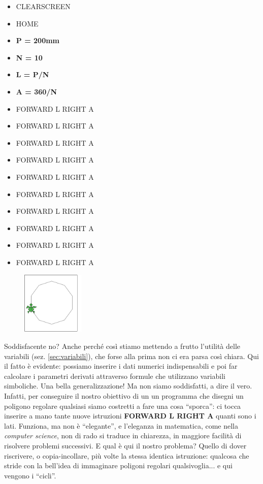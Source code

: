 \begin{scriptsize}
\begin{minipage}{0.40\textwidth}
\begin{itemize}[itemsep=-3pt,parsep=2pt]
\item[] CLEARSCREEN         
\item[] HOME
\item[] \textbf{P = 200mm}
\item[] \textbf{N = 10}	
\item[] \textbf{L = P/N}      
\item[] \textbf{A = 360/N}     
\item[] FORWARD L RIGHT A
\item[] FORWARD L RIGHT A
\item[] FORWARD L RIGHT A
\item[] FORWARD L RIGHT A
\item[] FORWARD L RIGHT A
\item[] FORWARD L RIGHT A
\item[] FORWARD L RIGHT A
\item[] FORWARD L RIGHT A
\item[] FORWARD L RIGHT A
\item[] FORWARD L RIGHT A      
\end{itemize}
\end{minipage}
\end{scriptsize}
\begin{minipage}{0.4\textwidth}
\begin{figure}[H]
   \includegraphics[width=3.0cm,trim=4 4 8 4,clip]{./images/ripetere/ripetere-4.png}
   \label{rip-3}
\end{figure}
\end{minipage} \hfill

Soddisfacente no? Anche perché così stiamo mettendo a frutto l'utilità delle variabili (sez. \ref{sec:variabili}), che forse alla prima non ci era parsa così chiara. Qui il fatto è evidente: possiamo inserire i dati numerici indispensabili e poi far calcolare i parametri derivati attraverso formule che utilizzano variabili simboliche. Una bella generalizzazione! Ma non siamo soddisfatti, a dire il vero. Infatti, per conseguire il nostro obiettivo di un un programma che disegni un poligono regolare qualsiasi siamo costretti a fare  una cosa “sporca”: ci tocca inserire a mano tante nuove istruzioni  \textbf{FORWARD L RIGHT A} quanti sono i lati. Funziona, ma non è “elegante”, e l'eleganza in matematica, come nella \textit{computer science}, non di rado si traduce in chiarezza, in maggiore facilità di risolvere problemi successivi. E qual è qui il nostro problema? Quello di dover riscrivere, o copia-incollare, più volte la stessa identica istruzione: qualcosa che stride con la bell'idea di immaginare poligoni regolari qualsivoglia... e qui vengono i “cicli”.

